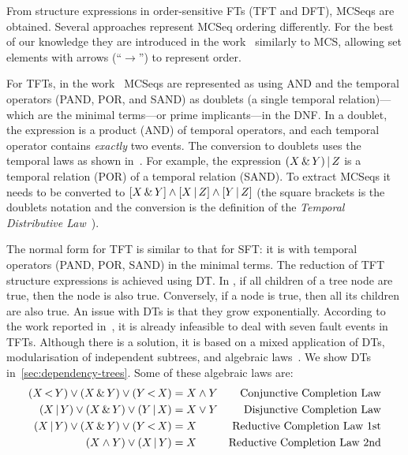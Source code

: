 \documentclass[12pt,openright,twoside,a4paper,oldfontcommands,english,brazil,final]{abntex2}
\theoremstyle{theo}
\newcommand{\parsin}[1]{\ensuremath\left( #1 \right)}
\newcommand{\squaresin}[1]{\ensuremath\left[ #1 \right]}
\def\pand{\ensuremath\operatorname{<}}
\def\por{\ensuremath\operatorname{|}}
\def\sand{\ensuremath\operatorname{\&}}
\begin{document}
From structure expressions in order-sensitive \acp{FT} (\ac{TFT} and \ac{DFT}), \acp{MCSeq} are obtained.
Several approaches represent \ac{MCSeq} ordering differently.
For the best of our knowledge they are introduced in the work~\cite{TD2004} similarly to \ac{MCS}, allowing set elements with arrows (``$\rightarrow$'') to represent order.

For \acp{TFT}, in the work~\cite{Walker2009} \acp{MCSeq} are represented as  using \ac{AND} and the temporal operators (\ac{PAND}, \ac{POR}, and \ac{SAND}) as doublets (a single temporal relation)---which are the minimal terms---or prime implicants---in the \ac{DNF}.
In a doublet, the expression is a product (\ac{AND}) of temporal operators, and each temporal operator contains \emph{exactly} two events.
The conversion to doublets uses the temporal laws as shown in~\cite{Walker2009}.
For example, the expression $\parsin{X \sand Y} \por Z$ is a temporal relation (\ac{POR}) of a temporal relation (\ac{SAND}).
To extract \acp{MCSeq} it needs to be converted to $\squaresin{X \sand Y} \land \squaresin{X \por Z} \land \squaresin{Y \por Z} $ (the square brackets is the doublets notation and the conversion is the definition of the \emph{Temporal Distributive Law}~\cite[p. 120]{Walker2009}).

The normal form for \ac{TFT} is similar to that for \ac{SFT}: it is  with temporal operators (\ac{PAND}, \ac{POR}, \ac{SAND}) in the minimal terms.
The reduction of \ac{TFT} structure expressions is achieved using \ac{DT}.
In , if all children of a tree node are true, then the node is also true.
Conversely, if a node is true, then all its children are also true.
An issue with \acp{DT} is that they grow exponentially.
According to the work reported in~\cite{WP2010}, it is already infeasible to deal with seven fault events in TFTs.
Although there is a solution, it is based on a mixed application of \acp{DT}, modularisation of independent subtrees, and algebraic laws~\cite{WP2009}.
We show \acp{DT} in~\cref{sec:dependency-trees}.
Some of these algebraic laws are:
%
\begin{subequations}
\begin{align}
  \parsin{X \pand Y} \lor \parsin{X \sand Y} \lor \parsin{Y \pand X} &= X \land Y & \text{Conjunctive Completion Law}\label{law:tft-conjunctive-completion-law}\\
  \parsin{X \por Y} \lor \parsin{X \sand Y} \lor \parsin{Y \por X} &= X \lor Y & \text{Disjunctive Completion Law}\\
  \parsin{X \por Y} \lor \parsin{X \sand Y} \lor \parsin{Y \pand X} &= X & \text{Reductive Completion Law 1st}\\
  \parsin{X \land Y} \lor \parsin{X \por Y}  &= X & \text{Reductive Completion Law 2nd}
\end{align}
\end{subequations}
\end{document}
